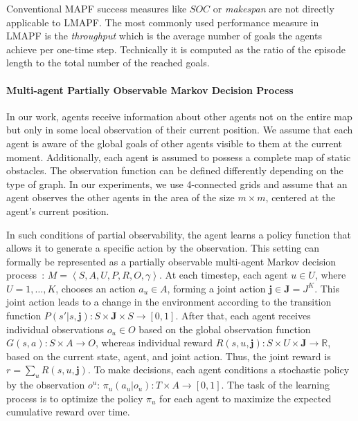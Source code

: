 \documentclass[letterpaper]{article} %
\begin{document}
Conventional MAPF success measures like $SOC$ or \emph{makespan} are not directly applicable to LMAPF. The most commonly used performance measure in LMAPF is the \emph{throughput} which is the average number of goals the agents achieve per one-time step. Technically it is computed as the ratio of the episode length to the total number of the reached goals.

\paragraph{Multi-agent Partially Observable Markov Decision Process} In our work, agents receive information about other agents not on the entire map but only in some local observation of their current position. We assume that each agent is aware of the global goals of other agents visible to them at the current moment. Additionally, each agent is assumed to possess a complete map of static obstacles. The observation function can be defined differently depending on the type of graph. In our experiments, we use 4-connected grids and assume that an agent observes the other agents in the area of the size $m\times m$, centered at the agent's current position.

In such conditions of partial observability, the agent learns a policy function that allows it to generate a specific action by the observation. This setting can formally be represented as a partially observable multi-agent Markov decision process~\cite{bernstein2002complexity,Pack1998}: $M=\left\langle S, A, U, P, R, O, \gamma\right\rangle$.
At each timestep, each agent $u \in U$, where $U = {1, \dots, K}$, chooses an action $a_u \in A$, forming a joint action $\mathbf{j} \in \mathbf{J} = J^K$. This joint action leads to a change in the environment according to the transition function $P(s' | s, \mathbf{j}): S \times \mathbf{J} \times S \rightarrow [0, 1]$. After that, each agent receives individual observations $o_u \in O$ based on the global observation function $G(s, a): S \times A \rightarrow O$, whereas individual reward $R(s, u, \mathbf{j}): S \times U \times \mathbf{J} \rightarrow \mathbb{R}$, based on the current state, agent, and joint action. Thus, the joint reward is $r=\sum_u R(s, u, \mathbf{j})$. To make decisions, each agent conditions a stochastic policy by the observation $o^u$: $\pi_u(a_u | o_u): T \times A \rightarrow [0, 1]$. The task of the learning process is to optimize the policy $\pi_u$ for each agent to maximize the expected cumulative reward over time.
\end{document}
